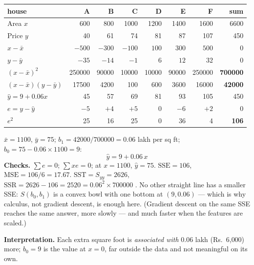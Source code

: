 \documentclass[11pt]{article}
\begin{document}
\begin{worked}
\begin{center}
\small
\begin{tabular}{@{}lrrrrrr|r@{}}
\toprule
house & A & B & C & D & E & F & sum\\ \midrule
Area $x$ & 600 & 800 & 1000 & 1200 & 1400 & 1600 & 6600\\
Price $y$ & 40 & 61 & 74 & 81 & 87 & 107 & 450\\ \midrule
$x - \bar x$ & $-500$ & $-300$ & $-100$ & $100$ & $300$ & $500$ & $0$\\
$y - \bar y$ & $-35$ & $-14$ & $-1$ & $6$ & $12$ & $32$ & $0$\\
$(x - \bar x)^2$ & 250000 & 90000 & 10000 & 10000 & 90000 & 250000 & \textbf{700000}\\
$(x - \bar x)(y - \bar y)$ & 17500 & 4200 & 100 & 600 & 3600 & 16000 & \textbf{42000}\\ \midrule
$\hat y = 9 + 0.06x$ & 45 & 57 & 69 & 81 & 93 & 105 & 450\\
$e = y - \hat y$ & $-5$ & $+4$ & $+5$ & $0$ & $-6$ & $+2$ & $0$\\
$e^2$ & 25 & 16 & 25 & 0 & 36 & 4 & \textbf{106}\\
\bottomrule
\end{tabular}
\end{center}
$\bar x = 1100$, $\bar y = 75$; $b_1 = 42000/700000 = 0.06$ lakh per sq ft;
$b_0 = 75 - 0.06 \times 1100 = 9$:
\[
  \boxed{\hat y = 9 + 0.06\,x}
\]
\textbf{Checks.} $\sum e = 0$; $\sum xe = 0$; at $x = 1100$, $\hat y = 75$.
$\mathrm{SSE} = 106$, $\mathrm{MSE} = 106/6 = 17.67$. $\mathrm{SST} = S_{yy} =
2626$, $\mathrm{SSR} = 2626 - 106 = 2520 = 0.06^2 \times 700000$ \checkmark.
No other straight line has a smaller SSE: $S(b_0, b_1)$ is a convex bowl with
one bottom at $(9, 0.06)$ --- which is why calculus, not gradient descent, is
enough here. (Gradient descent on the same SSE reaches the same answer, more slowly --- and much faster when the features are scaled.)

\textbf{Interpretation.} Each extra square foot is \emph{associated with}
$0.06$ lakh (Rs.~6{,}000) more;
$b_0 = 9$ is the value at $x = 0$, far outside the data and not meaningful on
its own.
\end{worked}
\end{document}

